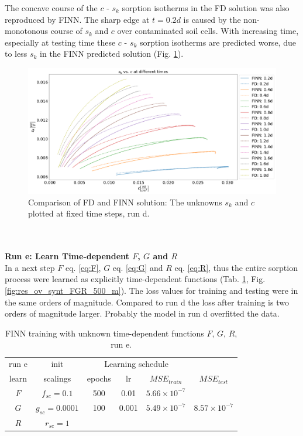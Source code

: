 The concave course of the $c$ - $s_k$ sorption isotherms in the FD solution was also reproduced by FINN. The sharp edge at $t=0.2d$ is caused by the non-monotonous course of $s_k$ and $c$ over contaminated soil cells. With increasing time, especially at testing time these $c$ - $s_k$ sorption isotherms are predicted worse, due to less $s_k$ in the FINN predicted solution (Fig. \ref{fig:res_sorp_synt_F}).
\begin{figure}
	\centering
	\includegraphics[width=\textwidth]{images/res_sorp_synt_F.png}
\caption[Comparison of FD and FINN sorption behavior, run d]{Comparison of FD and FINN solution: The unknowns $s_k$ and $c$ plotted at fixed time steps, run d.}
\label{fig:res_sorp_synt_F}
\end{figure}
\FloatBarrier
\\
\\
\textbf{Run e: Learn Time-dependent $F$, $G$ and $R$}
\\
In a next step $F$ eq. \ref{eq:F}, $G$ eq. \ref{eq:G} and $R$ eq. \ref{eq:R}, thus the entire sorption process were learned as explicitly time-dependent functions (Tab. \ref{tab:FGR_500}, Fig. \ref{fig:res_ov_synt_FGR_500_m}). The loss values for training and testing were in the same orders of magnitude. Compared to run d the loss after training is two orders of magnitude larger. Probably the model in run d overfitted the data.
\begin{table}[h!]
    \centering
    \begin{tabular}{c|c|cccc}
    run e & init & \multicolumn{3}{c}{Learning schedule}& \\
          learn & scalings & epochs & lr & $MSE_{train}$ & $MSE_{test}$ \\[0.2 cm] \hline
          $F$ & $f_{sc} = 0.1$ & 500 & 0.01 & $5.66 \times 10^{-7}$& \\
          $G$ & $g_{sc} = 0.0001$ & 100&0.001 & $5.49 \times 10^{-7}$ & $8.57 \times 10^{-7}$ \\
          $R$ & $r_{sc} = 1$ & & & & 
        \end{tabular}
    \caption[FINN training with unknown time-dependent functions $F$, $G$, $R$, run e]{FINN training with unknown time-dependent functions $F$, $G$, $R$, run e.}
    \label{tab:FGR_500}
\end{table}
